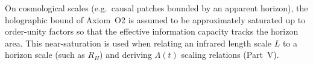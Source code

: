 \begin{assumption}
\label{assump:C1}
On cosmological scales (e.g.\ causal patches bounded by an apparent horizon), the holographic bound of Axiom~O2 is assumed to be approximately saturated up to order-unity factors so that the effective information capacity tracks the horizon area. This near-saturation is used when relating an infrared length scale $L$ to a horizon scale (such as $R_H$) and deriving $\Lambda(t)$ scaling relations (Part~V).
\end{assumption}
